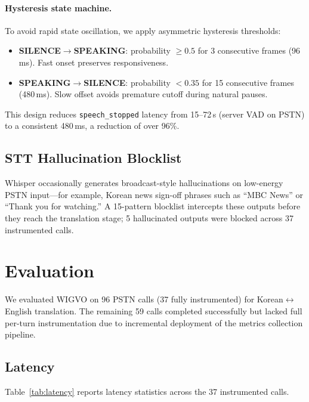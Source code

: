 \documentclass[11pt]{article}
\begin{document}
\paragraph{Hysteresis state machine.}
To avoid rapid state oscillation, we apply asymmetric hysteresis thresholds:

\begin{itemize}
    \item \textbf{SILENCE$\to$SPEAKING}: probability $\geq 0.5$ for 3 consecutive frames (96\,ms). Fast onset preserves responsiveness.
    \item \textbf{SPEAKING$\to$SILENCE}: probability $< 0.35$ for 15 consecutive frames (480\,ms). Slow offset avoids premature cutoff during natural pauses.
\end{itemize}

This design reduces \texttt{speech\_stopped} latency from 15--72\,s (server VAD on PSTN) to a consistent 480\,ms, a reduction of over 96\%.

\subsection{STT Hallucination Blocklist}

Whisper occasionally generates broadcast-style hallucinations on low-energy PSTN input---for example, Korean news sign-off phrases such as ``MBC News'' or ``Thank you for watching.'' A 15-pattern blocklist intercepts these outputs before they reach the translation stage; 5 hallucinated outputs were blocked across 37 instrumented calls.

\section{Evaluation}
\label{sec:evaluation}

We evaluated WIGVO on 96 PSTN calls (37 fully instrumented) for Korean$\leftrightarrow$English translation. The remaining 59 calls completed successfully but lacked full per-turn instrumentation due to incremental deployment of the metrics collection pipeline.

\subsection{Latency}

Table~\ref{tab:latency} reports latency statistics across the 37 instrumented calls.
\end{document}
